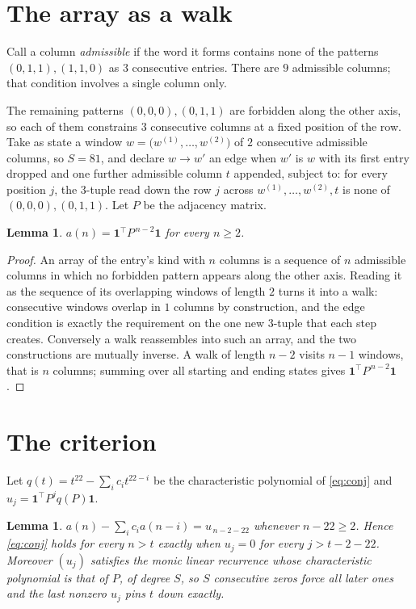 \documentclass[11pt,a4paper]{article}
\theoremstyle{plain}
\newtheorem{lemma}[theorem]{Lemma}
\theoremstyle{definition}
\begin{document}
\section{The array as a walk}

Call a column \emph{admissible} if the word it forms contains none of the patterns
$(0,1,1), (1,1,0)$ as $3$ consecutive entries. There are $9$ admissible columns; that condition
involves a single column only.

The remaining patterns $(0,0,0), (0,1,1)$ are forbidden along the other axis, so each of them
constrains $3$ consecutive columns at a fixed position of the row. Take as state a
window $w=\bigl(w^{(1)},\dots,w^{(2)}\bigr)$ of $2$ consecutive admissible
columns, so $S=81$, and declare $w\to w'$ an edge when $w'$ is $w$ with its first entry
dropped and one further admissible column $t$ appended, subject to: for every position
$j$, the $3$-tuple read down the row $j$ across $w^{(1)},\dots,w^{(2)},t$
is none of $(0,0,0), (0,1,1)$. Let $P$ be the adjacency matrix.

\begin{lemma}\label{lem:walk}
$a(n)=\mathbf{1}^{\!\top}P^{\,n-2}\mathbf{1}$ for every $n\ge2$.
\end{lemma}

\begin{proof}
An array of the entry's kind with $n$ columns is a sequence of $n$ admissible columns in
which no forbidden pattern appears along the other axis. Reading it as the sequence of its
overlapping windows of length $2$ turns it into a walk: consecutive windows overlap in
$1$ columns by construction, and the edge condition is exactly the requirement on the one
new $3$-tuple that each step creates. Conversely a walk reassembles into such an array,
and the two constructions are mutually inverse. A walk of length $n-2$ visits $n-1$
windows, that is $n$ columns; summing over all starting and ending states gives
$\mathbf{1}^{\!\top}P^{\,n-2}\mathbf{1}$.
\end{proof}

\section{The criterion}

Let $q(t)=t^{22}-\sum_i c_i t^{22-i}$ be the characteristic polynomial of
\eqref{eq:conj} and $u_j=\mathbf{1}^{\!\top}P^{j}q(P)\mathbf{1}$.

\begin{lemma}\label{lem:crit}
$a(n)-\sum_i c_i a(n-i)=u_{\,n-2-22}$ whenever $n-22\ge2$. Hence
\eqref{eq:conj} holds for every $n>t$ exactly when $u_j=0$ for every
$j>t-2-22$. Moreover $(u_j)$ satisfies the monic linear recurrence whose
characteristic polynomial is that of $P$, of degree $S$, so $S$ consecutive zeros force all
later ones and the last nonzero $u_j$ pins $t$ down exactly.
\end{lemma}
\end{document}
